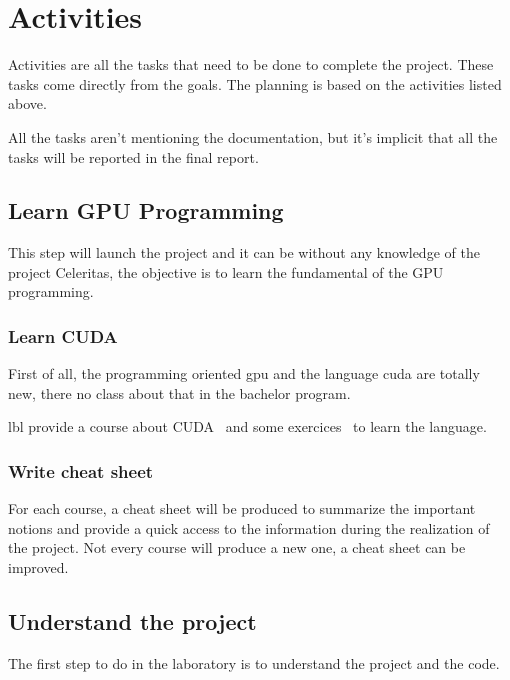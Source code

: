 \chapter{Activities}
\label{spec:ch:activities}

Activities are all the tasks that need to be done to complete the project. These tasks
come directly from the goals. The planning is based on the activities listed above.

All the tasks aren't mentioning the documentation, but it's implicit that all the tasks will be reported in the final report.

\section{Learn GPU Programming}
\label{spec:ch:activities:learn-gpu-programming}

This step will launch the project and it can be without any knowledge of the project Celeritas, the objective is to learn the fundamental of the GPU programming.


\subsection{Learn CUDA}
\label{spec:ch:activities:learn-gpu-programming:learn-cuda}

First of all, the programming oriented \acrshort{gpu} and the language \acrshort{cuda} are totally new, there no class about that in the bachelor program.

\acrlong{lbl} provide a course about CUDA~\cite{cuda-training} and some exercices~\cite{cuda-series} to learn the language. 


\subsection{Write cheat sheet}
\label{spec:spec:ch:activities:learn-gpu-programming:write-cheat-sheet}

For each course, a cheat sheet will be produced to summarize the important notions and provide a quick access to the information during the realization of the project.
Not every course will produce a new one, a cheat sheet can be improved.


\section{Understand the project}
\label{spec:ch:activities:understand-the-project}
The first step to do in the laboratory is to understand the project and the code.


